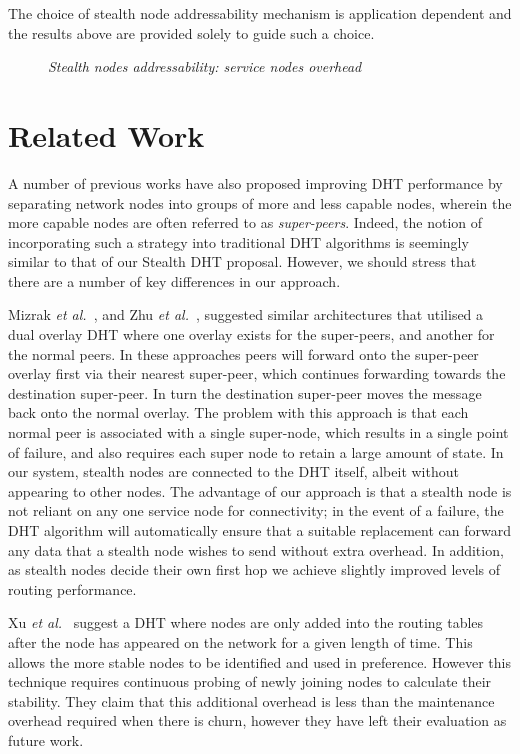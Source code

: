 \documentclass[letterpaper]{sig-alternate} %
\begin{document}
The choice of stealth node addressability mechanism is application
dependent and the results above are provided solely to guide such a
choice.

\begin{figure}[tb]
\centering {}
\caption{\em Stealth nodes addressability: service nodes overhead}
\label{fig:addressability}
\end{figure}

\section{Related Work}
\label{sect-related}

A number of previous works have also proposed improving DHT performance
by separating network nodes into groups of more and less capable nodes,
wherein the more capable nodes are often referred to as
\emph{super-peers}. Indeed, the notion of incorporating such a strategy
into traditional DHT algorithms is seemingly similar to that of our
Stealth DHT proposal. However, we should stress that there are a number
of key differences in our approach.

Mizrak \emph{et al.}~\cite{mizrak03structured}, and Zhu \emph{et
al.}~\cite{zhu03superpeer}, suggested similar architectures that
utilised a dual overlay DHT where one overlay exists for the
super-peers, and another for the normal peers. In these approaches
peers will forward onto the super-peer overlay first via their
nearest super-peer, which continues forwarding towards the
destination super-peer. In turn the destination super-peer moves the
message back onto the normal overlay. The problem with this approach
is that each normal peer is associated with a single super-node,
which results in a single point of failure, and also requires each
super node to retain a large amount of state. In our system, stealth
nodes are connected to the DHT itself, albeit without appearing to
other nodes. The advantage of our approach is that a stealth node is
not reliant on any one service node for connectivity; in the event
of a failure, the DHT algorithm will automatically ensure that a
suitable replacement can forward any data that a stealth node wishes
to send without extra overhead. In addition, as stealth nodes decide
their own first hop we achieve slightly improved levels of routing
performance.

Xu \emph{et al.}~\cite{xu03reducing} suggest a DHT where nodes are
only added into the routing tables after the node has appeared on
the network for a given length of time. This allows the more stable
nodes to be identified and used in preference. However this
technique requires continuous probing of newly joining nodes to
calculate their stability. They claim that this additional overhead
is less than the maintenance overhead required when there is churn,
however they have left their evaluation as future work.
\end{document}
